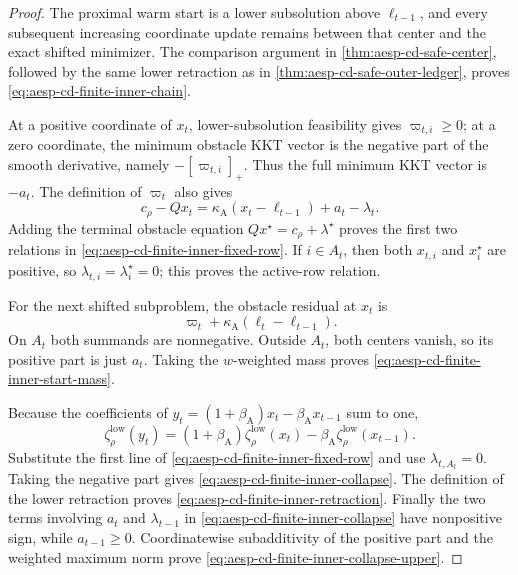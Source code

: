 \begin{proof}
The proximal warm start is a lower subsolution above $\ell_{t-1}$, and every
subsequent increasing coordinate update remains between that center and the
exact shifted minimizer.  The comparison argument in
\cref{thm:aesp-cd-safe-center}, followed by the same lower retraction as in
\cref{thm:aesp-cd-safe-outer-ledger}, proves
\cref{eq:aesp-cd-finite-inner-chain}.

At a positive coordinate of $x_t$, lower-subsolution feasibility gives
$\varpi_{t,i}\geq0$; at a zero coordinate, the minimum obstacle KKT vector is
the negative part of the smooth derivative, namely
$-[\varpi_{t,i}]_+$.  Thus the full minimum KKT vector is $-a_t$.  The
definition of $\varpi_t$ also gives
\begin{equation*}
 c_\rho-Qx_t
 =\kappa_{\mathrm A}(x_t-\ell_{t-1})
   +a_t-\lambda_t.
\end{equation*}
Adding the terminal obstacle equation
$Qx^\star=c_\rho+\lambda^\star$ proves the first two relations in
\cref{eq:aesp-cd-finite-inner-fixed-row}.  If $i\in A_t$, then both $x_{t,i}$
and $x_i^\star$ are positive, so $\lambda_{t,i}=\lambda_i^\star=0$; this
proves the active-row relation.

For the next shifted subproblem, the obstacle residual at $x_t$ is
\begin{equation*}
 \varpi_t+\kappa_{\mathrm A}(\ell_t-\ell_{t-1}).
\end{equation*}
On $A_t$ both summands are nonnegative.  Outside $A_t$, both centers vanish,
so its positive part is just $a_t$.  Taking the $w$-weighted mass proves
\cref{eq:aesp-cd-finite-inner-start-mass}.

Because the coefficients of $y_t=(1+\beta_{\mathrm A})x_t-
\beta_{\mathrm A}x_{t-1}$ sum to one,
\begin{equation*}
 \zeta_\rho^{\mathrm{low}}(y_t)
 =(1+\beta_{\mathrm A})
     \zeta_\rho^{\mathrm{low}}(x_t)
  -\beta_{\mathrm A}
     \zeta_\rho^{\mathrm{low}}(x_{t-1}).
\end{equation*}
Substitute the first line of
\cref{eq:aesp-cd-finite-inner-fixed-row} and use $\lambda_{t,A_t}=0$.
Taking the negative part gives
\cref{eq:aesp-cd-finite-inner-collapse}.  The definition of the lower
retraction proves \cref{eq:aesp-cd-finite-inner-retraction}.  Finally the
two terms involving $a_t$ and $\lambda_{t-1}$ in
\cref{eq:aesp-cd-finite-inner-collapse} have nonpositive sign, while
$a_{t-1}\geq0$.  Coordinatewise subadditivity of the positive part and the
weighted maximum norm prove
\cref{eq:aesp-cd-finite-inner-collapse-upper}.
\end{proof}

